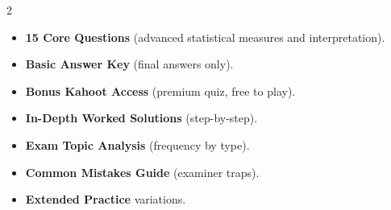 \documentclass[11pt,a4paper]{article}
\newcommand{\FullReleaseDate}{April 30, 2026}
\begin{document}
\vspace{8pt}

\begin{multicols}{2}
  \begin{tcolorbox}[card, title=\sffamily\bfseries\textcolor{white}{\faHandPointDown\ TODAY (Simplified Version)}, colbacktitle=mainblue, boxed title style={sharp corners, boxrule=0pt}]
    \begin{itemize}[leftmargin=1.2em, itemsep=2pt]
      \item \small \textbf{15 Core Questions} (advanced statistical measures and interpretation).
      \item \small \textbf{Basic Answer Key} (final answers only).
      \item \small \textbf{Bonus Kahoot Access} (premium quiz, free to play).
    \end{itemize}
  \end{tcolorbox}

  \columnbreak

  \begin{tcolorbox}[card, title=\sffamily\bfseries\textcolor{white}{\faRocket\ ON \FullReleaseDate\ (Full Upgrade)}, colbacktitle=mainblue, boxed title style={sharp corners, boxrule=0pt}]
    \begin{itemize}[leftmargin=1.2em, itemsep=2pt]
      \item \small \textbf{In-Depth Worked Solutions} (step-by-step).
      \item \small \textbf{Exam Topic Analysis} (frequency by type).
      \item \small \textbf{Common Mistakes Guide} (examiner traps).
      \item \small \textbf{Extended Practice} variations.
    \end{itemize}
  \end{tcolorbox}
\end{multicols}
\end{document}
